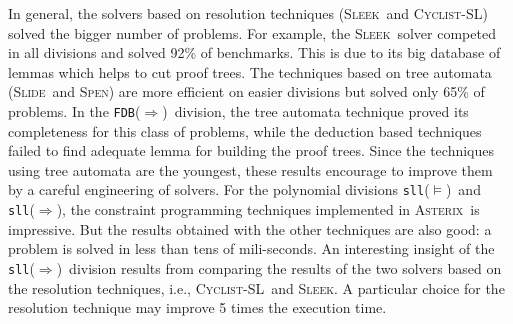 \documentclass[twoside,11pt]{article}
\newcommand{\limp}{\Rightarrow}
\newcommand{\sllsat}{\texttt{sll}($\models$)}
\newcommand{\sllent}{\texttt{sll}($\limp$)}
\newcommand{\FDBent}{\texttt{FDB}($\limp$)}
\newcommand{\ASTERIX}{\textsc{Asterix}}
\newcommand{\CYCLIST}{\textsc{Cyclist-SL}}
\newcommand{\SLEEK}{\textsc{Sleek}}
\newcommand{\SLIDE}{\textsc{Slide}}
\newcommand{\SPEN}{\textsc{Spen}}
\begin{document}
In general, the solvers based on resolution techniques (\SLEEK\ and \CYCLIST) solved the bigger number of problems.
For example, the \SLEEK\ solver competed in all divisions and solved 92\% of benchmarks. This is due to its big database of lemmas which helps to cut proof trees.
%
The techniques based on tree automata (\SLIDE\ and \SPEN) are more efficient on easier divisions but solved only 65\% of problems. In the \FDBent\ division, the tree automata technique proved its completeness for this class of problems, while the deduction based techniques failed to find adequate lemma for building the proof trees. 
Since the techniques using tree automata are the youngest, these results encourage to improve them by a careful engineering of solvers.
For the polynomial divisions \sllsat\ and \sllent, the constraint programming techniques implemented in \ASTERIX\  is impressive. But the results obtained with the other techniques are also good: a problem is solved in less than tens of mili-seconds. 
An interesting insight of the \sllent\ division results from comparing the results of the two solvers based on the resolution techniques, i.e., \CYCLIST\ and \SLEEK. A particular choice for the resolution technique may improve 5 times the execution time.


%
%
\end{document}
